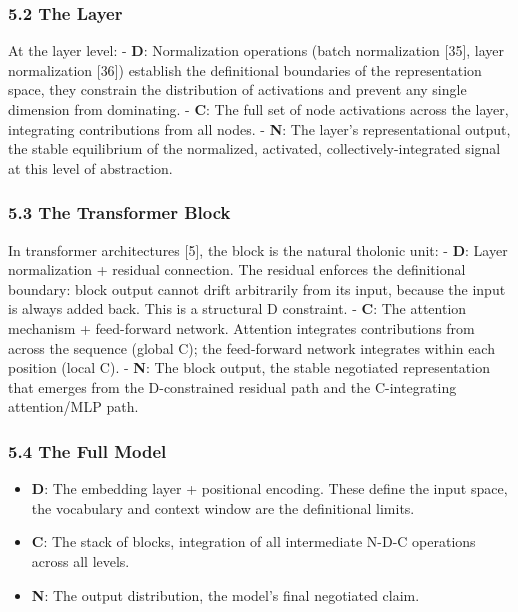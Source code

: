 \documentclass[
  11pt,
  letterpaper,
]{article}
\providecommand{\tightlist}{%
  \setlength{\itemsep}{0pt}\setlength{\parskip}{0pt}}
\begin{document}
\subsubsection{5.2 The Layer}\label{the-layer}

At the layer level: - \textbf{D}: Normalization operations (batch
normalization {[}35{]}, layer normalization {[}36{]}) establish the
definitional boundaries of the representation space, they constrain the
distribution of activations and prevent any single dimension from
dominating. - \textbf{C}: The full set of node activations across the
layer, integrating contributions from all nodes. - \textbf{N}: The
layer's representational output, the stable equilibrium of the
normalized, activated, collectively-integrated signal at this level of
abstraction.

\subsubsection{5.3 The Transformer Block}\label{the-transformer-block}

In transformer architectures {[}5{]}, the block is the natural tholonic
unit: - \textbf{D}: Layer normalization + residual connection. The
residual enforces the definitional boundary: block output cannot drift
arbitrarily from its input, because the input is always added back. This
is a structural D constraint. - \textbf{C}: The attention mechanism +
feed-forward network. Attention integrates contributions from across the
sequence (global C); the feed-forward network integrates within each
position (local C). - \textbf{N}: The block output, the stable
negotiated representation that emerges from the D-constrained residual
path and the C-integrating attention/MLP path.

\subsubsection{5.4 The Full Model}\label{the-full-model}

\begin{itemize}
\tightlist
\item
  \textbf{D}: The embedding layer + positional encoding. These define
  the input space, the vocabulary and context window are the
  definitional limits.
\item
  \textbf{C}: The stack of blocks, integration of all intermediate N-D-C
  operations across all levels.
\item
  \textbf{N}: The output distribution, the model's final negotiated
  claim.
\end{itemize}
\end{document}
